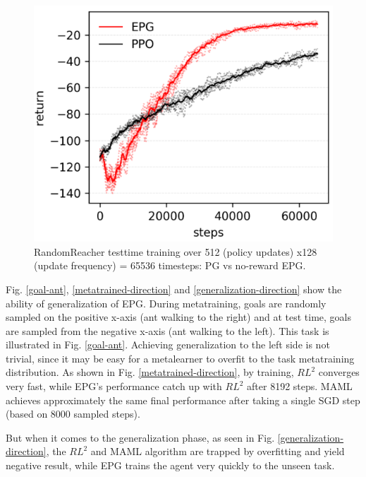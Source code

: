 \begin{figure}[H]
	\includegraphics[scale=0.6]{reacher.png}
	\centering
	\caption{RandomReacher testtime training over 512 (policy updates) x128 (update frequency) = 65536 timesteps: PG vs no-reward EPG.}
	\label{reacher}
\end{figure}

\par
Fig. \ref{goal-ant}, \ref{metatrained-direction} and \ref{generalization-direction} show the ability of generalization of EPG. During metatraining, goals are randomly sampled on the positive x-axis (ant walking to the right) and at test time, goals are sampled from the negative x-axis (ant walking to the left). This task is illustrated in Fig. \ref{goal-ant}. Achieving generalization to the left side is not trivial, since it may be easy for a metalearner to overfit to the task metatraining distribution. As shown in Fig. \ref{metatrained-direction}, by training, $RL^2$ converges very fast, while EPG's performance catch up with $RL^2$ after 8192 steps. MAML achieves approximately the same final performance after taking a single SGD step (based on 8000 sampled steps).

\par
But when it comes to the generalization phase, as seen in Fig. \ref{generalization-direction}, the $RL^2$ and MAML algorithm are trapped by overfitting and yield negative result, while EPG trains the agent very quickly to the unseen task.

